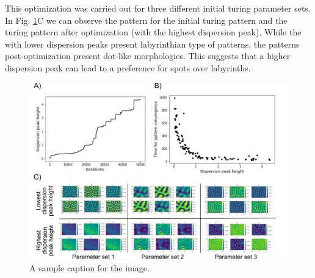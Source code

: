 This optimization was carried out for three different initial turing parameter sets. In Fig. \ref{fig:dispersion_peak_optimisation}C we can observe the pattern for the initial turing pattern and the turing pattern after optimization (with the highest dispersion peak).
While the with lower dispersion peaks present labyrinthian type of patterns, the patterns post-optimization present dot-like morphologies.
This suggests that a higher dispersion peak can lead to a preference for spots over labyrinths.


\begin{figure}[H] %
    \centering
    \includegraphics[width=1\textwidth]{chapters/Chapter 1/dispersion_peak_optimisation} %
    \caption{A sample caption for the image.}
    \label{fig:dispersion_peak_optimisation} %
\end{figure}



